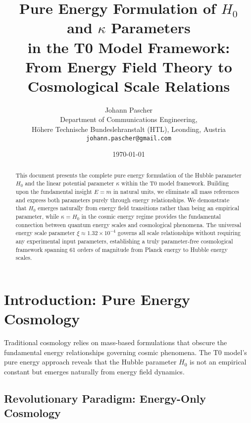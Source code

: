 \documentclass[12pt,a4paper]{article}
\begin{document}
	
	\title{Pure Energy Formulation of $H_0$ and $\kappa$ Parameters \\
		in the T0 Model Framework: \\
		From Energy Field Theory to Cosmological Scale Relations}
	\author{Johann Pascher\\
		Department of Communications Engineering, \\H{\"o}here Technische Bundeslehranstalt (HTL), Leonding, Austria\\
		\texttt{johann.pascher@gmail.com}}
	\date{\today}
	
	\maketitle
	
	\begin{abstract}
		This document presents the complete pure energy formulation of the Hubble parameter $H_0$ and the linear potential parameter $\kappa$ within the T0 model framework. Building upon the fundamental insight $E = m$ in natural units, we eliminate all mass references and express both parameters purely through energy relationships. We demonstrate that $H_0$ emerges naturally from energy field transitions rather than being an empirical parameter, while $\kappa = H_0$ in the cosmic energy regime provides the fundamental connection between quantum energy scales and cosmological phenomena. The universal energy scale parameter $\xi \approx 1.32 \times 10^{-4}$ governs all scale relationships without requiring any experimental input parameters, establishing a truly parameter-free cosmological framework spanning 61 orders of magnitude from Planck energy to Hubble energy scales.
	\end{abstract}
	
	\tableofcontents
	\newpage
	
	\section{Introduction: Pure Energy Cosmology}
	
	Traditional cosmology relies on mass-based formulations that obscure the fundamental energy relationships governing cosmic phenomena. The T0 model's pure energy approach reveals that the Hubble parameter $H_0$ is not an empirical constant but emerges naturally from energy field dynamics.
	
	\subsection{Revolutionary Paradigm: Energy-Only Cosmology}
	
\end{document}
